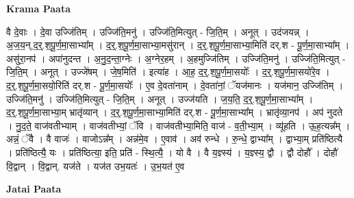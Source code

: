 \documentclass[17pt]{extarticle}
\begin{document}
\textbf{Krama Paata} \newline

वै दे॒वाः । दे॒वा उज्जि॑तिम् । उज्जि॑ति॒मनु॑ । उज्जि॑ति॒मित्युत् - जि॒ति॒म् । अनूत् । उद॑जयन्न् । अ॒ज॒य॒न्,द॒र्॒.श॒पू॒र्ण॒मा॒साभ्या᳚म् । द॒र्॒.श॒पू॒र्ण॒मा॒साभ्या॒मसु॑रान् । द॒र्॒.श॒पू॒र्ण॒मा॒साभ्या॒मिति॑ दर्.श - पू॒र्ण॒मा॒साभ्या᳚म् । असु॑रा॒नप॑ । अपा॑नुदन्त । अ॒नु॒द॒न्ता॒ग्नेः । अ॒ग्नेर॒हम् । अ॒हमुज्जि॑तिम् । उज्जि॑ति॒मनु॑ । उज्जि॑ति॒मित्युत् - जि॒ति॒म् । अनूत् । उज्जे॑षम् । जे॒ष॒मिति॑ । इत्या॑ह । आ॒ह॒ द॒र्॒.श॒पू॒र्ण॒मा॒सयोः᳚ । द॒र्॒.श॒पू॒र्ण॒मा॒सयो॑रे॒व । द॒र्॒.श॒पू॒र्ण॒मा॒सयो॒रिति॑ दर्.श - पू॒र्ण॒मा॒सयोः᳚ । ए॒व दे॒वता॑नाम् । दे॒वता॑नां॒ ॅयज॑मानः । यज॑मान॒ उज्जि॑तिम् । उज्जि॑ति॒मनु॑ । उज्जि॑ति॒मित्युत् - जि॒ति॒म् । अनूत् । उज्ज॑यति । ज॒य॒ति॒ द॒र्॒.श॒पू॒र्ण॒मा॒साभ्या᳚म् । द॒र्॒.श॒पू॒र्ण॒मा॒साभ्या॒म् भ्रातृ॑व्यान् । द॒र्॒.श॒पू॒र्ण॒मा॒साभ्या॒मिति॑ दर्.श - पू॒र्ण॒मा॒साभ्या᳚म् । भ्रातृ॑व्या॒नप॑ । अप॑ नुदते । नु॒द॒ते॒ वाज॑वतीभ्याम् । वाज॑वतीभ्यां॒ ॅवि । वाज॑वतीभ्या॒मिति॒ वाज॑ - व॒ती॒भ्या॒म् । व्यू॑हति । ऊ॒ह॒त्यन्न᳚म् । अन्नं॒ ॅवै । वै वाजः॑ । वाजोऽन्न᳚म् । अन्न॑मे॒व । ए॒वाव॑ । अव॑ रुन्धे । रु॒न्धे॒ द्वाभ्या᳚म् । द्वाभ्या॒म् प्रति॑ष्ठित्यै । प्रति॑ष्ठित्यै॒ यः । प्रति॑ष्ठित्या॒ इति॒ प्रति॑ - स्थि॒त्यै॒ । यो वै । वै य॒ज्ञ्स्य॑ । य॒ज्ञ्स्य॒ द्वौ । द्वौ दोहौ᳚ । दोहौ॑ वि॒द्वान् । वि॒द्वान्. यज॑ते । यज॑त उभ॒यतः॑ । उ॒भ॒यत॑ ए॒व \newline

\textbf{Jatai Paata} \newline
\end{document}
